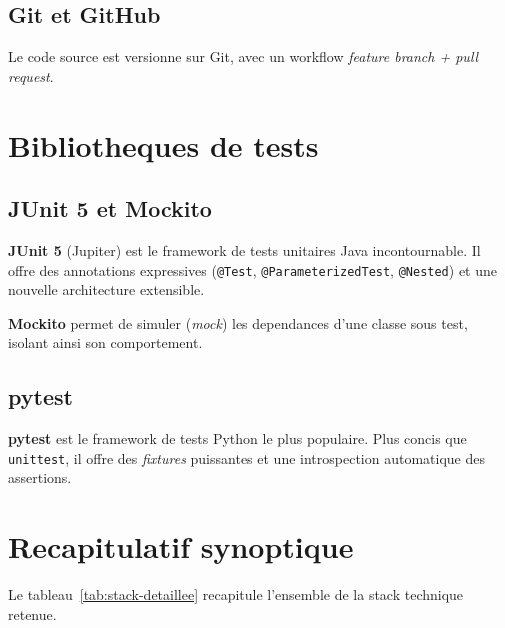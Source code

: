 \documentclass[12pt,a4paper,oneside]{report}
\begin{document}
\subsection{Git et GitHub}

Le code source est versionne sur Git, avec un workflow \emph{feature branch
+ pull request}.

\section{Bibliotheques de tests}

\subsection{JUnit 5 et Mockito}

\textbf{JUnit 5} (Jupiter) est le framework de tests unitaires Java
incontournable. Il offre des annotations expressives
(\texttt{@Test}, \texttt{@ParameterizedTest}, \texttt{@Nested}) et une
nouvelle architecture extensible.

\textbf{Mockito} permet de simuler (\emph{mock}) les dependances d'une
classe sous test, isolant ainsi son comportement.

\subsection{pytest}

\textbf{pytest} est le framework de tests Python le plus populaire. Plus
concis que \texttt{unittest}, il offre des \emph{fixtures} puissantes et
une introspection automatique des assertions.

\section{Recapitulatif synoptique}

Le tableau~\ref{tab:stack-detaillee} recapitule l'ensemble de la stack
technique retenue.
\end{document}
